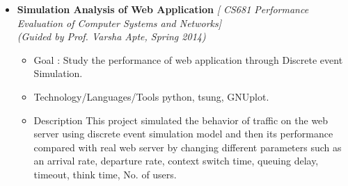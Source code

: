 \begin{itemize}
\item \textbf{Simulation Analysis of Web Application } \emph{[ CS681 Performance Evaluation of Computer Systems and Networks]} \\
	\emph{(Guided by Prof. Varsha Apte, Spring 2014)} \hfill \\[-0.6cm]
	\begin{itemize}
	  \item Goal : Study the performance of web application through Discrete event Simulation. \\[-0.6cm]
	      \item Technology/Languages/Tools  python, tsung, GNUplot. \\[-0.6cm]
	      \item Description 
	      This project simulated the behavior of traffic on the web server using discrete event simulation model and
	      then its performance compared with real web server by changing different parameters such as an arrival
	      rate, departure rate, context switch time, queuing delay, timeout, think time, No. of users. \\[-0.6cm]
	\end{itemize}
	

\end{itemize}

